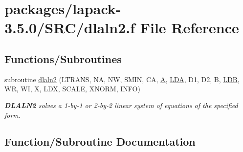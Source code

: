 \hypertarget{dlaln2_8f}{}\section{packages/lapack-\/3.5.0/\+S\+R\+C/dlaln2.f File Reference}
\label{dlaln2_8f}
\subsection*{Functions/\+Subroutines}
\begin{DoxyCompactItemize}
\item 
subroutine \hyperlink{dlaln2_8f_ad0418b909a2871d01b8d43c24f0f207b}{dlaln2} (L\+T\+R\+A\+N\+S, N\+A, N\+W, S\+M\+I\+N, C\+A, \hyperlink{classA}{A}, \hyperlink{example__user_8c_ae946da542ce0db94dced19b2ecefd1aa}{L\+D\+A}, D1, D2, B, \hyperlink{example__user_8c_a50e90a7104df172b5a89a06c47fcca04}{L\+D\+B}, W\+R, W\+I, X, L\+D\+X, S\+C\+A\+L\+E, X\+N\+O\+R\+M, I\+N\+F\+O)
\begin{DoxyCompactList}\small\item\em {\bfseries D\+L\+A\+L\+N2} solves a 1-\/by-\/1 or 2-\/by-\/2 linear system of equations of the specified form. \end{DoxyCompactList}\end{DoxyCompactItemize}


\subsection{Function/\+Subroutine Documentation}
\hypertarget{dlaln2_8f_ad0418b909a2871d01b8d43c24f0f207b}{}
